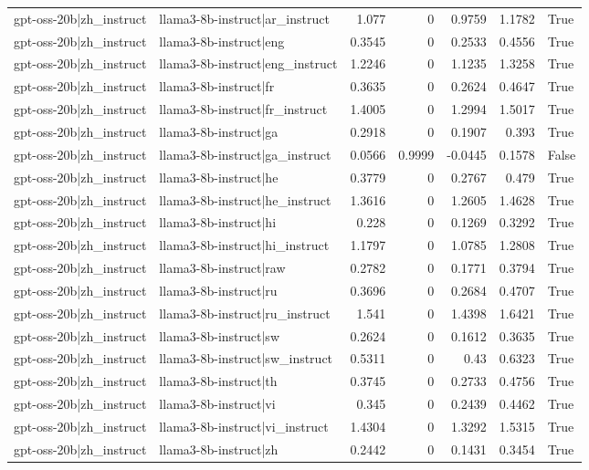 \begin{table}
\begin{tabular}{l l r r r r l}
gpt-oss-20b|zh_instruct & llama3-8b-instruct|ar_instruct & 1.077 & 0 & 0.9759 & 1.1782 & True \\
gpt-oss-20b|zh_instruct & llama3-8b-instruct|eng & 0.3545 & 0 & 0.2533 & 0.4556 & True \\
gpt-oss-20b|zh_instruct & llama3-8b-instruct|eng_instruct & 1.2246 & 0 & 1.1235 & 1.3258 & True \\
gpt-oss-20b|zh_instruct & llama3-8b-instruct|fr & 0.3635 & 0 & 0.2624 & 0.4647 & True \\
gpt-oss-20b|zh_instruct & llama3-8b-instruct|fr_instruct & 1.4005 & 0 & 1.2994 & 1.5017 & True \\
gpt-oss-20b|zh_instruct & llama3-8b-instruct|ga & 0.2918 & 0 & 0.1907 & 0.393 & True \\
gpt-oss-20b|zh_instruct & llama3-8b-instruct|ga_instruct & 0.0566 & 0.9999 & -0.0445 & 0.1578 & False \\
gpt-oss-20b|zh_instruct & llama3-8b-instruct|he & 0.3779 & 0 & 0.2767 & 0.479 & True \\
gpt-oss-20b|zh_instruct & llama3-8b-instruct|he_instruct & 1.3616 & 0 & 1.2605 & 1.4628 & True \\
gpt-oss-20b|zh_instruct & llama3-8b-instruct|hi & 0.228 & 0 & 0.1269 & 0.3292 & True \\
gpt-oss-20b|zh_instruct & llama3-8b-instruct|hi_instruct & 1.1797 & 0 & 1.0785 & 1.2808 & True \\
gpt-oss-20b|zh_instruct & llama3-8b-instruct|raw & 0.2782 & 0 & 0.1771 & 0.3794 & True \\
gpt-oss-20b|zh_instruct & llama3-8b-instruct|ru & 0.3696 & 0 & 0.2684 & 0.4707 & True \\
gpt-oss-20b|zh_instruct & llama3-8b-instruct|ru_instruct & 1.541 & 0 & 1.4398 & 1.6421 & True \\
gpt-oss-20b|zh_instruct & llama3-8b-instruct|sw & 0.2624 & 0 & 0.1612 & 0.3635 & True \\
gpt-oss-20b|zh_instruct & llama3-8b-instruct|sw_instruct & 0.5311 & 0 & 0.43 & 0.6323 & True \\
gpt-oss-20b|zh_instruct & llama3-8b-instruct|th & 0.3745 & 0 & 0.2733 & 0.4756 & True \\
gpt-oss-20b|zh_instruct & llama3-8b-instruct|vi & 0.345 & 0 & 0.2439 & 0.4462 & True \\
gpt-oss-20b|zh_instruct & llama3-8b-instruct|vi_instruct & 1.4304 & 0 & 1.3292 & 1.5315 & True \\
gpt-oss-20b|zh_instruct & llama3-8b-instruct|zh & 0.2442 & 0 & 0.1431 & 0.3454 & True \\

\end{tabular}
\end{table}
